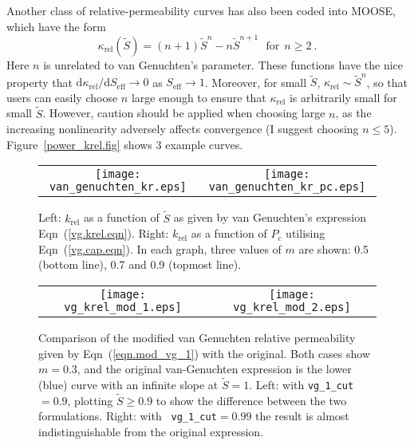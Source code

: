 \documentclass[]{scrreprt}
\begin{document}
Another class of relative-permeability curves has also been coded into
MOOSE, which have the form
\begin{equation}
\kappa_{\mathrm{rel}}(\tilde{S}) = (n+1)\tilde{S}^{n} - n
\tilde{S}^{n+1} \ \ \ \mbox{for}\ \ n\geq 2 \ .
\label{power.krel.eqn}
\end{equation}
Here $n$ is unrelated to van Genuchten's parameter.  These functions
have the nice property that
$\mathrm{d}\kappa_{\mathrm{rel}}/\mathrm{d} S_{\mathrm{eff}}
\rightarrow 0$ as $S_{\mathrm{eff}}\rightarrow 1$.  Moreover, for
small $\tilde{S}$, $\kappa_{\mathrm{rel}} \sim \tilde{S}^{n}$, so that
users can easily choose $n$ large enough to ensure that
$\kappa_{\mathrm{rel}}$ is arbitrarily small for small $\tilde{S}$.
However, caution should be applied when choosing large $n$, as the
increasing nonlinearity adversely affects convergence (I suggest
choosing $n \leq 5$).
Figure~\ref{power_krel.fig} shows 3 example curves.

\begin{figure}[htb]
\centering
\begin{tabular}{cc}
\texttt{[image: van\_genuchten\_kr.eps]} &
\texttt{[image: van\_genuchten\_kr\_pc.eps]}
\end{tabular}
\caption{Left: $k_{\mathrm{rel}}$ as a function of $\tilde{S}$
  as given   by van Genuchten's expression Eqn~(\ref{vg.krel.eqn}).
  Right: $k_{\mathrm{rel}}$ as a function of $P_{c}$ utilising
  Eqn~(\ref{vg.cap.eqn}).  In each graph, three values
  of $m$ are shown: 0.5 (bottom line), 0.7 and 0.9 (topmost line).}
\label{van_genuchten_krel.fig}
\end{figure}

\begin{figure}[htb]
\centering
\begin{tabular}{cc}
\texttt{[image: vg\_krel\_mod\_1.eps]} &
\texttt{[image: vg\_krel\_mod\_2.eps]}
\end{tabular}
\caption{Comparison of the modified van Genuchten relative
  permeability given by Eqn~(\ref{eqn.mod_vg_1}) with the original.
  Both cases show $m=0.3$, and the original van-Genuchten expression
  is the lower (blue) curve with an infinite slope at $\tilde{S}=1$.
  Left: with {\tt vg\_1\_cut}$=0.9$, plotting $\tilde{S}\geq 0.9$ to
  show the difference between the two formulations.  Right: with {\tt
    vg\_1\_cut}$=0.99$ the result is almost indistinguishable from the
  original expression.}
\label{vg_krel_mod.fig}
\end{figure}
\end{document}
